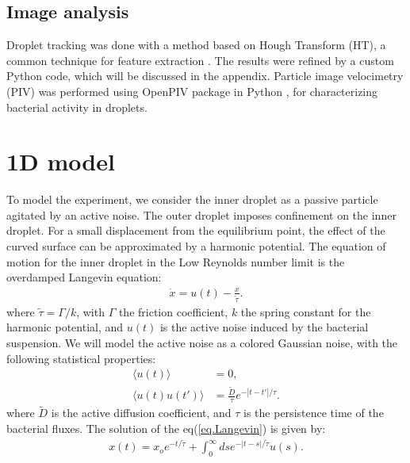 \documentclass[%
10pt,
superscriptaddress,
twocolumn,
 amsmath,amssymb,
 aps,prx,
]{revtex4-2}
\begin{document}
\subsection{Image analysis}

Droplet tracking was done with a method based on Hough Transform (HT), a common technique for feature extraction \cite{Stockman2001}. 
The results were refined by a custom Python code, which will be discussed in the appendix.
Particle image velocimetry (PIV) was performed using OpenPIV package in Python \cite{OpenPIV}, for characterizing bacterial activity in droplets.

\section{1D model}

To model the experiment, we consider the inner droplet as a passive particle agitated by an active noise.
The outer droplet imposes confinement on the inner droplet.
For a small displacement from the equilibrium point, the effect of the curved surface can be approximated by a harmonic potential.
The equation of motion for the inner droplet in the Low Reynolds number limit is the overdamped Langevin equation:
%
\begin{align}
    \label{eq.Langevin}
    \dot{x}=u(t)-\frac{x}{\tilde{\tau}}.
\end{align}
%
where $\tilde{\tau}=\Gamma/k$, with $\Gamma$ the friction coefficient, $k$ the spring constant for the harmonic potential, and $u(t)$ is the active noise induced by the bacterial suspension.
We will model the active noise as a colored Gaussian noise, with the following statistical properties:
%
\begin{align}
    \label{eq.act.noise}
    \langle u(t)\rangle &=0,\\
    \langle u(t)u(t')\rangle &=\frac{\tilde{D}}{\tau}e^{-|t-t'|/\tau}.
\end{align}
%
where $\tilde{D}$ is the active diffusion coefficient, and $\tau$ is the persistence time of the bacterial fluxes. The solution of the eq(\ref{eq.Langevin}) is given by:
%
\begin{align}
    \label{sol:langevin}
    x(t) = x_oe^{-t/\tilde{\tau}}+\int_{0}^{\infty}ds e^{-|t-s|/\tilde{\tau}}u(s).
\end{align}
\end{document}
